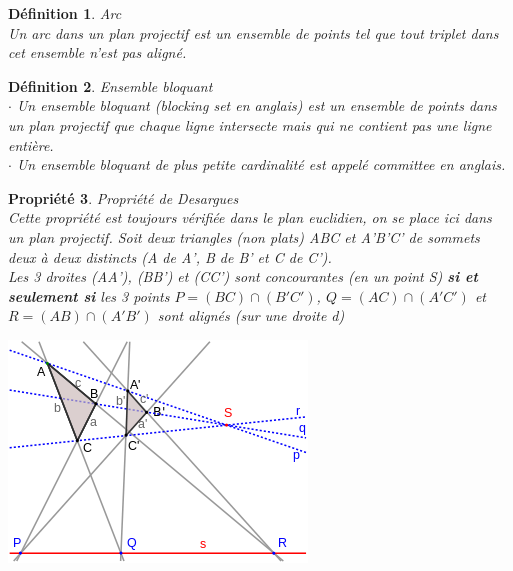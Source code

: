 \documentclass[a4paper]{article}
\newtheorem{Def}{Définition}[section]
\newtheorem{Propr}[Def]{Propriété}
\begin{document}
\begin{Def}{Arc} \\
  Un arc dans un plan projectif est un ensemble de points tel que tout triplet dans cet ensemble n'est pas aligné.
\end{Def}
\begin{Def}{Ensemble bloquant}\\
 $\cdot$ Un ensemble bloquant (\emph{blocking set} en anglais) est un ensemble de points dans un plan projectif que chaque ligne intersecte mais qui ne contient pas une ligne entière.\\
  $\cdot$ Un ensemble bloquant de plus petite cardinalité est appelé \emph{committee} en anglais.\\
\end{Def}
\bigskip
\begin{Propr}{Propriété de Desargues}\\
Cette propriété est toujours vérifiée dans le plan euclidien, on se place ici dans un plan projectif.
  Soit deux triangles (non plats) ABC et A'B'C' de sommets deux à deux distincts (A de A', B de B' et C de C'). \\
  Les 3 droites (AA'), (BB') et (CC') sont concourantes (en un point S) \textbf{si et seulement si} les 3 points $P = (BC) \cap (B'C')$, $Q = (AC) \cap (A'C')$ et $R = (AB) \cap (A'B')$ sont alignés (sur une droite d)
  \end{Propr}
\begin{center}
\includegraphics[scale=0.6]{desargues.png}  
\end{center}  
\newpage
\end{document}

